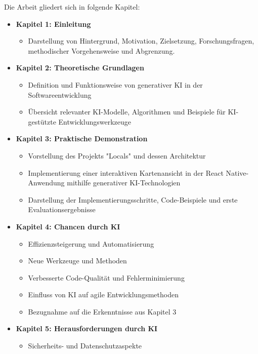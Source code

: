 Die Arbeit gliedert sich in folgende Kapitel:

\begin{itemize}
    \item \textbf{Kapitel 1: Einleitung} 
        \begin{itemize}
            \item Darstellung von Hintergrund, Motivation, Zielsetzung, Forschungsfragen, methodischer Vorgehensweise und Abgrenzung.
        \end{itemize}
    \item \textbf{Kapitel 2: Theoretische Grundlagen}   
        \begin{itemize}
            \item Definition und Funktionsweise von generativer KI in der Softwareentwicklung
            \item Übersicht relevanter KI-Modelle, Algorithmen und Beispiele für KI-gestützte Entwicklungswerkzeuge
        \end{itemize}
    \item \textbf{Kapitel 3: Praktische Demonstration}
        \begin{itemize}
            \item Vorstellung des Projekts "Locals" und dessen Architektur
            \item Implementierung einer interaktiven Kartenansicht in der React Native-Anwendung mithilfe generativer KI-Technologien
            \item Darstellung der Implementierungsschritte, Code-Beispiele und erste Evaluationsergebnisse 
        \end{itemize}
    \item \textbf{Kapitel 4: Chancen durch KI} 
        \begin{itemize}
            \item Effizienzsteigerung und Automatisierung
            \item Neue Werkzeuge und Methoden
            \item Verbesserte Code-Qualität und Fehlerminimierung
            \item Einfluss von KI auf agile Entwicklungsmethoden
            \item Bezugnahme auf die Erkenntnisse aus Kapitel 3
        \end{itemize}
    \item \textbf{Kapitel 5: Herausforderungen durch KI} 
        \begin{itemize}
            \item Sicherheits- und Datenschutzaspekte

\end{itemize}
\end{itemize}
